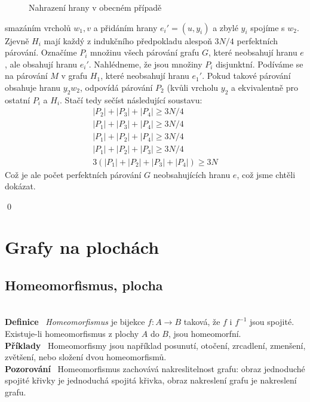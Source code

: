 \documentclass{article}
\renewcommand{\paragraph}[1]{\ \\\smallskip\noindent\textbf{#1}\ }
\begin{document}
\begin{enumerate}
\begin{enumerate}
\begin{figure}[H]
\caption{Nahrazení hrany v obecném případě}
\label{parovani:obecne}
\end{figure}
		smazáním vrcholů $w_1,v$ a přidáním hrany $e_i'=(u,y_i)$ a zbylé $y_i$ 
		spojíme s $w_2$.  Zjevně $H_i$ mají každý z indukčního předpokladu 
		alespoň $3N/4$ perfektních párování.  Označíme $P_i$ množinu všech 
		párování grafu $G$, které neobsahují hranu $e$, ale obsahují hranu 
		$e_i'$.  Nahlédneme, že jsou množiny $P_i$ disjunktní.  Podíváme se na 
		párování $M$ v grafu $H_1$, které neobsahují hranu $e_1'$. Pokud takové 
		párování obsahuje hranu $y_2w_2$, odpovídá párování $P_2$ (kvůli vrcholu 
		$y_2$ a ekvivalentně pro ostatní $P_i$ a $H_i$. Stačí tedy sečíst 
		následující soustavu:
		\begin{align}
			|P_2|+|P_3|+|P_4| \geq 3N/4\\
			|P_1|+|P_3|+|P_4| \geq 3N/4\\
			|P_1|+|P_2|+|P_4| \geq 3N/4\\
			|P_1|+|P_2|+|P_3| \geq 3N/4\\
			3(|P_1|+|P_2|+|P_3| + |P_4|) \geq 3N
		\end{align}
		Což je ale počet perfektních párování $G$ neobsahujících hranu $e$, což 
		jsme chtěli dokázat.
	\end{enumerate}
\end{enumerate}
\qed

\section{Grafy na plochách}
\subsection{Homeomorfismus, plocha}
\paragraph{Definice} \textit{Homeomorfismus} je bijekce $f: A\to B$ taková, že 
$f$ i $f^{-1}$ jsou spojité. Existuje-li homeomorfismus z plochy $A$ do $B$, 
jsou homeomorfní.
\paragraph{Příklady} Homeomorfismy jsou například posunutí, otočení, zrcadlení, 
zmenšení, zvětšení, nebo složení dvou homeomorfismů.
\paragraph{Pozorování} Homeomorfismus zachovává nakreslitelnost grafu: obraz 
jednoduché spojité křivky je jednoduchá spojitá křivka, obraz nakreslení grafu 
je nakreslení grafu.
\end{document}
